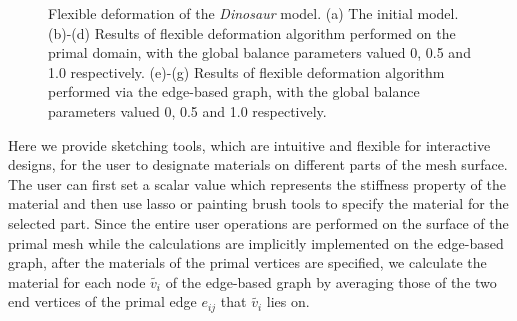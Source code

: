 \begin{figure} [htbp]
{\begin{minipage}[b]{0.32\textwidth}
    \end{minipage}}
  \caption{Flexible deformation of the \textit{Dinosaur} model. (a) The initial model. (b)-(d) Results of flexible deformation algorithm performed on the primal domain, with the global balance parameters valued 0, 0.5 and 1.0 respectively. (e)-(g) Results of flexible deformation algorithm performed via the edge-based graph, with the global balance parameters valued 0, 0.5 and 1.0 respectively. }
  \label{fig:deformdino} %
\end{figure}

Here we provide sketching  tools, which are intuitive and flexible
for interactive designs, for the user to designate materials on
different parts of the mesh surface. The user can first set a scalar
value which represents the stiffness property of the material and
then use lasso or painting brush tools to specify the material for
the selected part. Since the entire user operations are performed on
the surface of the primal mesh while the calculations are implicitly
implemented on the edge-based graph, after the materials of the
primal vertices are specified, we calculate the material for each
node $\tilde{v_i}$ of the edge-based graph by averaging those of the
two end vertices of the primal edge $e_{ij}$ that $\tilde{v_i}$ lies
on.


